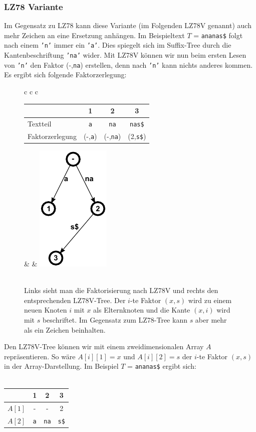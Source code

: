 \documentclass[a4paper,11pt]{scrartcl}%
\theoremstyle{change}
\theoremstyle{nonumberplain}
\theoremstyle{change}
\theoremstyle{nonumberplain}
\theoremstyle{change}
\theoremstyle{nonumberplain}
\begin{document}
	\subsubsection{LZ78 Variante}\label{sec:lz78-variante}
	Im Gegensatz zu LZ78 kann diese Variante (im Folgenden LZ78V genannt) auch mehr Zeichen an eine Ersetzung anhängen.
	Im Beispieltext $T$ = \texttt{ananas\$} folgt nach einem \texttt{'n'} immer ein \texttt{'a'}. Dies spiegelt sich im Suffix-Tree durch die Kantenbeschriftung \texttt{'na'} wider. Mit LZ78V können wir nun beim ersten Lesen von \texttt{'n'} den Faktor (-,\texttt{na}) erstellen, denn nach \texttt{'n'} kann nichts anderes kommen. Es ergibt sich folgende Faktorzerlegung:\\
	\begin{figure}[h]
	\begin{tabular}[t]{c c c}
		\begin{tabular}[b]{l c c c}\hline
			& 1 & 2 & 3  \\ \hline
  		Textteil & \texttt{a} & \texttt{na} & \texttt{nas\$} \\ \hline
  		Faktorzerlegung & (-,\texttt{a}) & (-,\texttt{na}) & (2,\texttt{s\$}) \\ \hline
		\end{tabular} & \hspace{2cm} & \includegraphics{./pics/ananas_LZ78VTree}\\\\
	\end{tabular}
	\caption{Links sieht man die Faktorisierung nach LZ78V und rechts den entsprechenden LZ78V-Tree. Der $i$-te Faktor $(x,s)$ wird zu einem neuen Knoten $i$ mit $x$ als Elternknoten und die Kante $(x,i)$ wird mit $s$ beschriftet. Im Gegensatz zum LZ78-Tree kann $s$ aber mehr als ein Zeichen beinhalten.}
	\label{fig:lz78v}
	\end{figure}
	
	Den LZ78V-Tree können wir mit einem zweidimensionalen Array $A$ repräsentieren. So wäre $A[i][1] = x$ und $A[i][2] = s$ der $i$-te Faktor $(x,s)$ in der Array-Darstellung. Im Beispiel $T$ = \texttt{ananas\$} ergibt sich:\\\\
	\begin{tabular}[b]{l c c c}
						\hline
							& 1 & 2 & 3 \\\hline
						$A[1]$ & - & - & 2 \\\hline
						$A[2]$	& \texttt{a} & \texttt{na} & \texttt{s\$}\\\hline
						
			
	\end{tabular}
	
\end{document}
